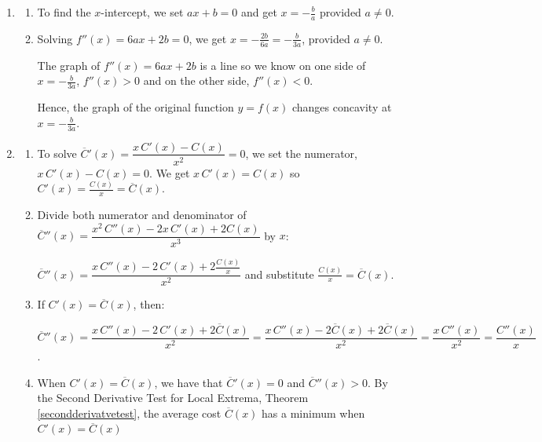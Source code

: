 \begin{enumerate}
\setcounter{enumi}{\value{HW}}

\item  \begin{enumerate}  \item To find the $x$-intercept, we set $ax+b = 0$  and get $x = -\frac{b}{a}$ provided $a \neq 0$.

\item  Solving  $f''(x) = 6ax + 2b = 0$, we get $x = -\frac{2b}{6a} = - \frac{b}{3a}$, provided $a \neq 0$.  

\smallskip

The graph of $f''(x) =  6ax + 2b$ is a line so we know on one side of $x= - \frac{b}{3a}$, $f''(x) > 0$ and on the other side, $f''(x) < 0$.  

\smallskip

Hence, the graph of the original function $y = f(x)$ changes concavity at $x = -\frac{b}{3a}$.

\end{enumerate}

\item\begin{enumerate}  \item  To solve $\overline{C}'(x) = \dfrac{x \, C'(x) - C(x)}{x^2} = 0$, we set the numerator,  $x \, C'(x) - C(x) = 0$. We get  $x \, C'(x)  = C(x)$ so $C'(x) = \frac{C(x)}{x} = \overline{C}(x)$.

\smallskip

\item  Divide both numerator and denominator of  $\overline{C}''(x) = \dfrac{x^2 \, C''(x) - 2x\, C'(x) + 2C(x)}{x^3}$ by $x$: 

\smallskip

$\overline{C}''(x) = \dfrac{x \, C''(x) - 2 \, C'(x) + 2\frac{C(x)}{x}}{x^2}$ and substitute  $\frac{C(x)}{x} = \overline{C}(x)$.

\smallskip

\item  If  $C'(x) = \overline{C}(x)$, then:

\smallskip

 $\overline{C}''(x)  = \dfrac{x\, C''(x) - 2\, C'(x) + 2\overline{C}(x)}{x^2} =  \dfrac{x\, C''(x) - 2\overline{C} (x) + 2\overline{C}(x)}{x^2}= \dfrac{x\, C''(x)}{x^2} =  \dfrac{C''(x)}{x}$.

\smallskip

\item  When $C'(x) = \overline{C}(x)$, we have that $\overline{C}'(x) = 0$ and $\overline{C}''(x) > 0$.  By the Second Derivative Test for Local Extrema,  Theorem \ref{secondderivatvetest}, the average cost $\overline{C}(x)$ has a minimum when $C'(x) = \overline{C}(x)$ 


\end{enumerate}
\end{enumerate}
